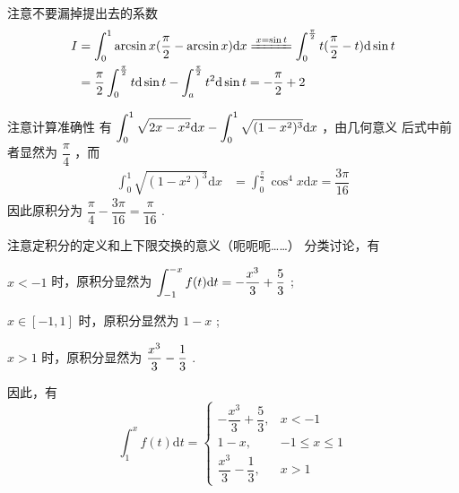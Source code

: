 \begin{answer}[660T59]{注意不要漏掉提出去的系数}
    \begin{equation*}
        \begin{aligned}
            I &= \int_0^1 \arcsin x (\dfrac{\pi}{2} - \arcsin x) \mathrm{d} x 
            \xlongequal{x = \sin t} \int_0^{\frac{\pi}{2}}
            t(\frac{\pi}{2} - t) \mathrm{d} \sin t
            \\&= \frac{\pi}{2}\int_0^{\frac{\pi}{2}} t\mathrm{d}\sin t
            - \int_a^{\frac{\pi}{2}} t^2 \mathrm{d}\sin t
            = - \dfrac{\pi}{2} + 2
        \end{aligned}
    \end{equation*}
\end{answer}

\begin{answer}[660T60]{注意计算准确性}
    有 $ \displaystyle \int_0^1\sqrt{2x-x^2}\mathrm{d}x-\int_0^1\sqrt{(1-x^2)^3}\mathrm{d}x$ ，由几何意义
    后式中前者显然为 $ \dfrac{\pi}{4} $ ，而\begin{equation*}
        \begin{aligned}
            \int_0^1\sqrt{(1-x^2)^3}\mathrm{d}x &= \int_0^{\frac{\pi}{2}}\cos^4 x\mathrm{d}x = \dfrac{3\pi}{16}
        \end{aligned}
    \end{equation*}
    因此原积分为 $ \dfrac{\pi}{4} - \dfrac{3\pi}{16} = \dfrac{\pi}{16} $ .
\end{answer}

\begin{answer}[660T64]{注意定积分的定义和上下限交换的意义（呃呃呃……）}
    分类讨论，有
    \begin{BulletItemize}
        \item $ x < -1 $ 时，原积分显然为 $ \displaystyle \int_{-1}^{-x} f(t)\mathrm{d}t = -\dfrac{x^3}{3} + \dfrac{5}{3} $ ;
        \item $ x \in [-1,1] $ 时，原积分显然为 $ 1 - x $ ;
        \item $ x > 1 $ 时，原积分显然为 $ \displaystyle \dfrac{x^3}{3} - \dfrac{1}{3} $ .
    \end{BulletItemize}
    因此，有$$
        \int_1^x f(t)\mathrm{d}t = \begin{cases}
            -\dfrac{x^3}{3} + \dfrac{5}{3}, & x < -1 \\ 
            1 - x, & -1 \leq x\leq 1\\ 
            \dfrac{x^3}{3} - \dfrac{1}{3}, & x > 1
        \end{cases}
    $$ 
\end{answer}

